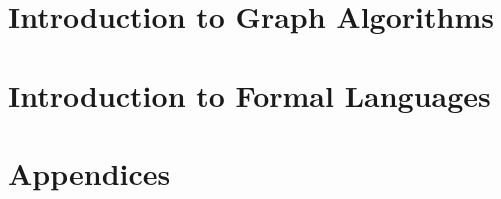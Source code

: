 \documentclass[10pt,oneside]{memoir}
\theoremstyle{definition}
\numberwithin{Lemma}{chapter}
\numberwithin{Exercise}{section}
\theoremstyle{remark}
\begin{document}
\part{Introduction to Graph Algorithms}
\renewcommand{\rm}{} %







\part{Introduction to Formal Languages}




\fi


\part{Appendices}

\appendix


 














\printindex
\end{document}
